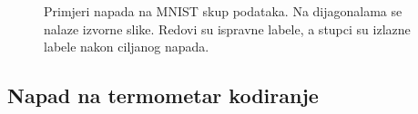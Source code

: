 \documentclass[utf8, diplomski]{fer}
\begin{document}
\begin{figure}[H]
  \centering
  \hfill
  \caption{Primjeri napada na MNIST skup podataka. Na dijagonalama se nalaze izvorne slike. Redovi su ispravne labele, a stupci su izlazne labele nakon ciljanog napada.}
\end{figure}\label{fig:mnist_carlini}

\subsection{Napad na termometar kodiranje}
\end{document}
